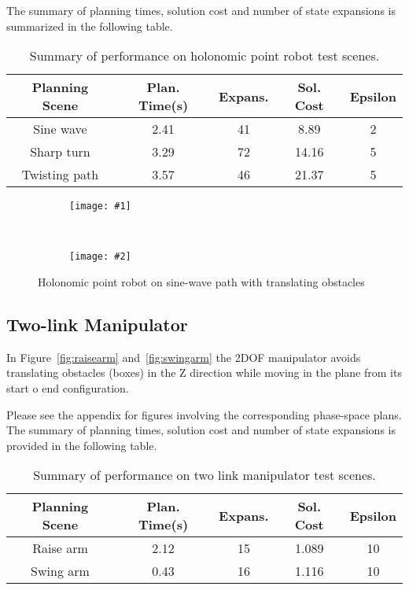 \documentclass[letterpaper,12pt]{article} %
\newcommand{\ffigdoublevert}[4]{
    \begin{figure}[h!]
    \centering

    \begin{subfigure}[t!]{0.7\linewidth}
    \texttt{[image: \#1]}
    \caption{}
    \label{fig:#4L}
    \end{subfigure}
    ~
    \begin{subfigure}[b!]{0.7\linewidth}
    \texttt{[image: \#2]}
    \caption{}
    \label{fig:#4R}
    \end{subfigure}

    \caption{#3}
    \label{fig:#4}
    \end{figure}
}
\begin{document}
The summary of planning times, solution cost and number of state expansions is summarized in the following table.


\begin{table}[hc]
\begin{center}
\begin{tabular}{c|c|c|c|c}
\hline
Planning Scene & Plan. Time(s) & Expans. & Sol. Cost & Epsilon\\
\hline
Sine wave & 2.41 & 41 & 8.89 & 2\\
Sharp turn & 3.29 & 72 & 14.16 & 5 \\
Twisting path & 3.57 & 46 & 21.37 & 5\\
\hline
\end{tabular}
\caption{\small{Summary of performance on holonomic point robot test scenes.}}
\label{tab:performance_results}
\end{center}
\end{table}

\ffigdoublevert{pics/trans1}{pics/trans2}{Holonomic point robot on sine-wave path with translating obstacles}{hovertran}

\subsection{Two-link Manipulator}

In Figure~\ref{fig:raisearm} and~\ref{fig:swingarm} the 2DOF manipulator avoids translating obstacles (boxes) in the Z direction while moving in the plane from its start o end configuration.

Please see the appendix for figures involving the corresponding phase-space plans. The summary of planning times, solution cost and number of state expansions is provided in the following table.

\begin{table}[hc]
\begin{center}
\begin{tabular}{c|c|c|c|c}
\hline
Planning Scene & Plan. Time(s) & Expans. & Sol. Cost & Epsilon\\
\hline
Raise arm & 2.12 & 15 & 1.089 & 10\\
Swing arm & 0.43 & 16 & 1.116 & 10 \\
\hline
\end{tabular}
\caption{\small{Summary of performance on two link manipulator test scenes.}}
\label{tab:performance_results}
\end{center}
\end{table}
\end{document}
